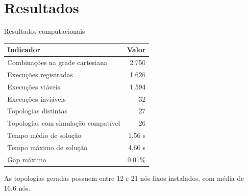 \documentclass[11pt,brazil]{beamer}
\begin{document}
\section{Resultados}

\begin{frame}{Resultados computacionais}
  \begin{center}
    \begin{tabular}{lr}
      \toprule
      \textbf{Indicador} & \textbf{Valor}\\
      \midrule
      Combinações na grade cartesiana & 2.750\\
      Execuções registradas & 1.626\\
      Execuções viáveis & 1.594\\
      Execuções inviáveis & 32\\
      Topologias distintas & 27\\
      Topologias com simulação compatível & 26\\
      \midrule
      Tempo médio de solução & 1,56 s\\
      Tempo máximo de solução & 4,60 s\\
      Gap máximo & 0,01\%\\
      \bottomrule
    \end{tabular}
  \end{center}
  \vfill
  As topologias geradas possuem entre 12 e 21 nós fixos instalados, com média de 16,6 nós.
\end{frame}
\end{document}
